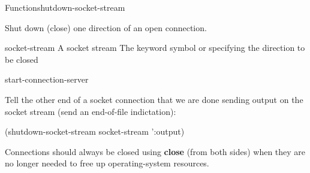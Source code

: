 \documentclass[10pt,twoside,english,pdftex]{article}
\begin{document}
\begin{functiondoc}{Function}{shutdown-socket-stream}%
  {}
%
%

\fnsyntax

\fnpurpose Shut down (close) one direction of an open connection.

\fnpackage {}

\fnmodule {}

\fnargs
\begin{args}{socket-stream}
 A socket stream
\arg[direction] The keyword symbol  or  
specifying the direction to be closed
\end{args}

\begin{alsos}{start-connection-server}
\end{alsos}

\fnexample
Tell the other end of a socket connection that we are done sending
output on the socket stream (send an end-of-file indictation):
\begin{example}
  (shutdown-socket-stream socket-stream ':output)
\end{example}

\fnnotes Connections should always be closed using \textbf{close} (from
both sides) when they are no longer needed to free up operating-system
resources.

\end{functiondoc}

\end{document}
